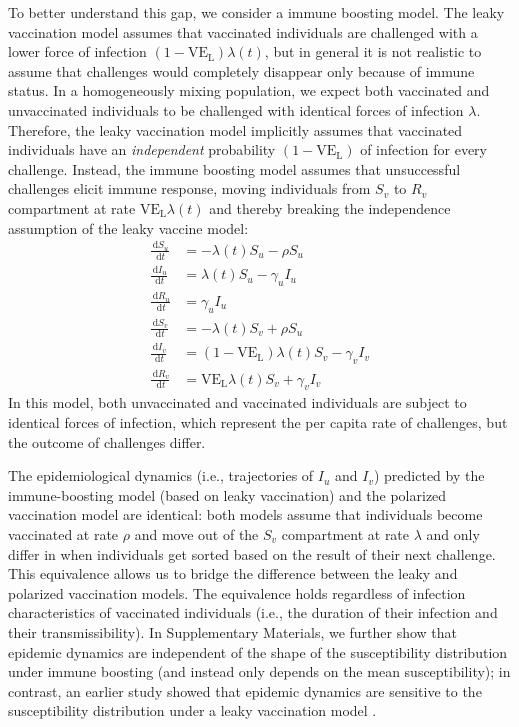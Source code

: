 \documentclass[12pt]{article}
\newcommand{\dd}[1]{\ensuremath{\, \mathrm{d}#1}}
\newcommand{\VE}{\ensuremath{\mathrm{VE}}}
\newcommand{\VEL}{\ensuremath{\VE_{\mathrm{L}}}}
\begin{document}
To better understand this gap, we consider a immune boosting model.
The leaky vaccination model assumes that vaccinated individuals are challenged with a lower force of infection $(1-\VEL) \lambda(t)$, but in general it is not realistic to assume that challenges would completely disappear only because of immune status.
In a homogeneously mixing population, we expect both vaccinated and unvaccinated individuals to be challenged with identical forces of infection $\lambda$.
Therefore, the leaky vaccination model implicitly assumes that vaccinated individuals have an \emph{independent} probability $(1-\VEL)$ of infection for every challenge.
Instead, the immune boosting model assumes that unsuccessful challenges elicit immune response, moving individuals from $S_v$ to $R_v$ compartment at rate $\VEL \lambda(t)$ and thereby breaking the independence assumption of the leaky vaccine model:  
\begin{align}
\frac{\dd S_u}{\dd t} &= - \lambda(t) S_u - \rho S_u \\
\frac{\dd I_u}{\dd t} &= \lambda(t) S_u - \gamma_u I_u \\
\frac{\dd R_u}{\dd t} &= \gamma_u I_u \\
\frac{\dd S_v}{\dd t} &= - \lambda(t) S_v + \rho S_u \\
\frac{\dd I_v}{\dd t} &= (1-\VEL) \lambda(t) S_v - \gamma_v I_v \\
\frac{\dd R_v}{\dd t} &= \VEL \lambda(t) S_v + \gamma_v I_v
\end{align}
In this model, both unvaccinated and vaccinated individuals are subject to identical forces of infection, which represent the per capita rate of challenges, but the outcome of challenges differ.



The epidemiological dynamics (i.e., trajectories of $I_u$ and $I_v$) predicted by the immune-boosting model (based on leaky vaccination) and the polarized vaccination model are identical: 
both models assume that individuals become vaccinated at rate $\rho$ and move out of the $S_v$ compartment at rate $\lambda$ and only differ in when individuals get sorted based on the result of their next challenge.
This equivalence allows us to bridge the difference between the leaky and polarized vaccination models.
The equivalence holds regardless of infection characteristics of vaccinated individuals (i.e., the duration of their infection and their transmissibility).
In Supplementary Materials, we further show that epidemic dynamics are independent of the shape of the susceptibility distribution under immune boosting (and instead only depends on the mean susceptibility);
in contrast, an earlier study showed that epidemic dynamics are sensitive to the susceptibility distribution under a leaky vaccination model \citep{gomes2014missing}.
\end{document}
